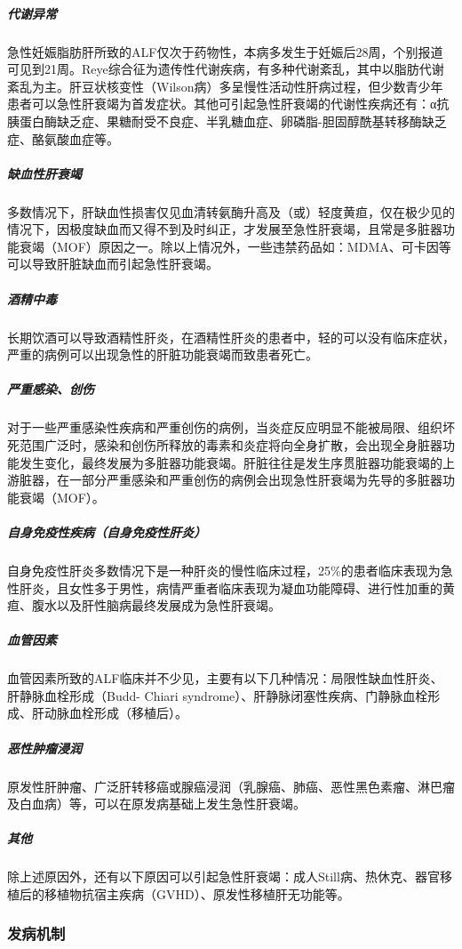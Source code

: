 \subparagraph{代谢异常}

急性妊娠脂肪肝所致的ALF仅次于药物性，本病多发生于妊娠后28周，个别报道可见到21周。Reye综合征为遗传性代谢疾病，有多种代谢紊乱，其中以脂肪代谢紊乱为主。肝豆状核变性（Wilson病）多呈慢性活动性肝病过程，但少数青少年患者可以急性肝衰竭为首发症状。其他可引起急性肝衰竭的代谢性疾病还有：α抗胰蛋白酶缺乏症、果糖耐受不良症、半乳糖血症、卵磷脂-胆固醇酰基转移酶缺乏症、酪氨酸血症等。

\subparagraph{缺血性肝衰竭}

多数情况下，肝缺血性损害仅见血清转氨酶升高及（或）轻度黄疸，仅在极少见的情况下，因极度缺血而又得不到及时纠正，才发展至急性肝衰竭，且常是多脏器功能衰竭（MOF）原因之一。除以上情况外，一些违禁药品如：MDMA、可卡因等可以导致肝脏缺血而引起急性肝衰竭。

\subparagraph{酒精中毒}

长期饮酒可以导致酒精性肝炎，在酒精性肝炎的患者中，轻的可以没有临床症状，严重的病例可以出现急性的肝脏功能衰竭而致患者死亡。

\subparagraph{严重感染、创伤}

对于一些严重感染性疾病和严重创伤的病例，当炎症反应明显不能被局限、组织坏死范围广泛时，感染和创伤所释放的毒素和炎症将向全身扩散，会出现全身脏器功能发生变化，最终发展为多脏器功能衰竭。肝脏往往是发生序贯脏器功能衰竭的上游脏器，在一部分严重感染和严重创伤的病例会出现急性肝衰竭为先导的多脏器功能衰竭（MOF）。

\subparagraph{自身免疫性疾病（自身免疫性肝炎）}

自身免疫性肝炎多数情况下是一种肝炎的慢性临床过程，25\%的患者临床表现为急性肝炎，且女性多于男性，病情严重者临床表现为凝血功能障碍、进行性加重的黄疸、腹水以及肝性脑病最终发展成为急性肝衰竭。

\subparagraph{血管因素}

血管因素所致的ALF临床并不少见，主要有以下几种情况：局限性缺血性肝炎、肝静脉血栓形成（Budd-
Chiari
syndrome）、肝静脉闭塞性疾病、门静脉血栓形成、肝动脉血栓形成（移植后）。

\subparagraph{恶性肿瘤浸润}

原发性肝肿瘤、广泛肝转移癌或腺癌浸润（乳腺癌、肺癌、恶性黑色素瘤、淋巴瘤及白血病）等，可以在原发病基础上发生急性肝衰竭。

\subparagraph{其他}

除上述原因外，还有以下原因可以引起急性肝衰竭：成人Still病、热休克、器官移植后的移植物抗宿主疾病（GVHD）、原发性移植肝无功能等。

\subsubsection{发病机制}

